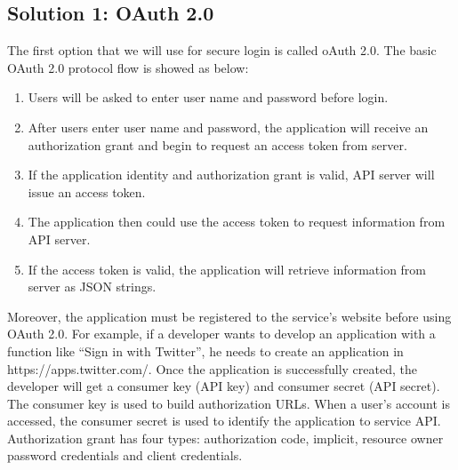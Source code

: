\documentclass[letterpaper, 10pt,titlepage]{article}
\begin{document}
\subsection{Solution 1: OAuth 2.0}
The first option that we will use for secure login is called oAuth 2.0. The basic OAuth 2.0 protocol flow is showed as below: 
\begin{enumerate}
\item Users will be asked to enter user name and password before login. 
\item After users enter user name and password, the application will receive an authorization grant and begin to request an access token from server. 
\item If the application identity and authorization grant is valid, API server will issue an access token. 
\item The application then could use the access token to request information from API server. 
\item If the access token is valid, the application will retrieve information from server as JSON strings.
\end{enumerate}
Moreover, the application must be registered to the service’s website before using OAuth 2.0. For example, if a developer wants to develop an application with a function like “Sign in with Twitter”, he needs to create an application in https://apps.twitter.com/. Once the application is successfully created, the developer will get a consumer key (API key) and consumer secret (API secret). The consumer key is used to build authorization URLs.  When a user’s account is accessed, the consumer secret is used to identify the application to service API. Authorization grant has four types: authorization code, implicit, resource owner password credentials and client credentials. \cite{OAuth2}\\
\end{document}
